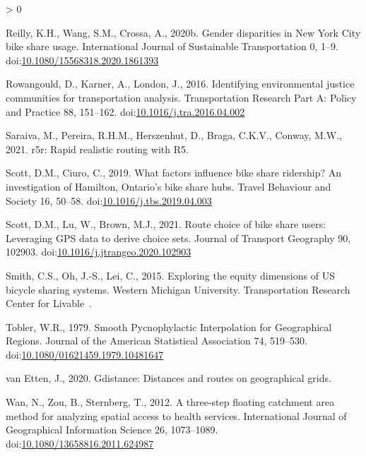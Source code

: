 \documentclass[]{elsarticle} %
\newlength{\cslhangindent}
\newenvironment{CSLReferences}[2] %
 {%
  \setlength{\parindent}{0pt}
  \ifodd #1 \everypar{\setlength{\hangindent}{\cslhangindent}}\ignorespaces\fi
  \ifnum #2 > 0
  \setlength{\parskip}{#2\baselineskip}
  \fi
 }%
 {}
\begin{document}
\begin{CSLReferences}{1}{0}
\leavevmode\hypertarget{ref-reillyGenderDisparitiesNew2020}{}%
Reilly, K.H., Wang, S.M., Crossa, A., 2020b. Gender disparities in {New
York City} bike share usage. International Journal of Sustainable
Transportation 0, 1--9.
doi:\href{https://doi.org/10.1080/15568318.2020.1861393}{10.1080/15568318.2020.1861393}

\leavevmode\hypertarget{ref-rowangouldIdentifyingEnvironmentalJustice2016}{}%
Rowangould, D., Karner, A., London, J., 2016. Identifying environmental
justice communities for transportation analysis. Transportation Research
Part A: Policy and Practice 88, 151--162.
doi:\href{https://doi.org/10.1016/j.tra.2016.04.002}{10.1016/j.tra.2016.04.002}

\leavevmode\hypertarget{ref-R-r5r}{}%
Saraiva, M., Pereira, R.H.M., Herszenhut, D., Braga, C.K.V., Conway,
M.W., 2021. r5r: Rapid realistic routing with R5.

\leavevmode\hypertarget{ref-scottWhatFactorsInfluence2019}{}%
Scott, D.M., Ciuro, C., 2019. What factors influence bike share
ridership? {An} investigation of {Hamilton}, {Ontario}'s bike share
hubs. Travel Behaviour and Society 16, 50--58.
doi:\href{https://doi.org/10.1016/j.tbs.2019.04.003}{10.1016/j.tbs.2019.04.003}

\leavevmode\hypertarget{ref-scottRouteChoiceBike2021}{}%
Scott, D.M., Lu, W., Brown, M.J., 2021. Route choice of bike share
users: Leveraging GPS data to derive choice sets. Journal of Transport
Geography 90, 102903.
doi:\href{https://doi.org/10.1016/j.jtrangeo.2020.102903}{10.1016/j.jtrangeo.2020.102903}

\leavevmode\hypertarget{ref-smith2015exploring}{}%
Smith, C.S., Oh, J.-S., Lei, C., 2015. Exploring the equity dimensions
of US bicycle sharing systems. Western Michigan University.
Transportation Research Center for Livable~.

\leavevmode\hypertarget{ref-toblerSmoothPycnophylacticInterpolation1979}{}%
Tobler, W.R., 1979. Smooth {Pycnophylactic Interpolation} for
{Geographical Regions}. Journal of the American Statistical Association
74, 519--530.
doi:\href{https://doi.org/10.1080/01621459.1979.10481647}{10.1080/01621459.1979.10481647}

\leavevmode\hypertarget{ref-R-gdistance}{}%
van Etten, J., 2020. Gdistance: Distances and routes on geographical
grids.

\leavevmode\hypertarget{ref-wanThreestepFloatingCatchment2012}{}%
Wan, N., Zou, B., Sternberg, T., 2012. A three-step floating catchment
area method for analyzing spatial access to health services.
International Journal of Geographical Information Science 26,
1073--1089.
doi:\href{https://doi.org/10.1080/13658816.2011.624987}{10.1080/13658816.2011.624987}


\end{CSLReferences}
\end{document}
